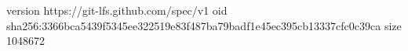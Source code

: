 version https://git-lfs.github.com/spec/v1
oid sha256:3366bca5439f5345ee322519e83f487ba79badf1e45ec395cb13337cfc0c39ca
size 1048672
